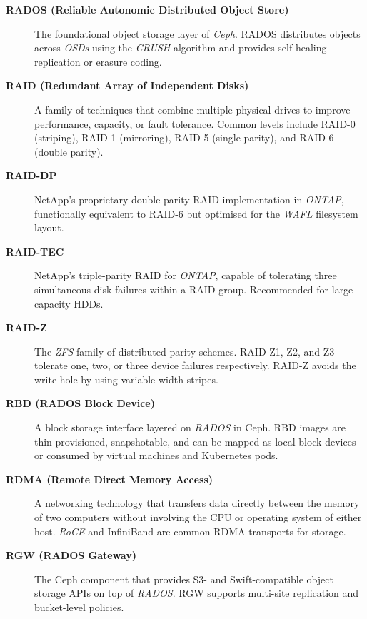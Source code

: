 \begin{description}

\item[\textbf{RADOS (Reliable Autonomic Distributed Object Store)}]
The foundational object storage layer of \textit{Ceph}. RADOS distributes
objects across \textit{OSDs} using the \textit{CRUSH} algorithm and
provides self-healing replication or erasure coding.

\item[\textbf{RAID (Redundant Array of Independent Disks)}]
A family of techniques that combine multiple physical drives to improve
performance, capacity, or fault tolerance. Common levels include RAID-0
(striping), RAID-1 (mirroring), RAID-5 (single parity), and RAID-6
(double parity).

\item[\textbf{RAID-DP}]
NetApp's proprietary double-parity RAID implementation in \textit{ONTAP},
functionally equivalent to RAID-6 but optimised for the \textit{WAFL}
filesystem layout.

\item[\textbf{RAID-TEC}]
NetApp's triple-parity RAID for \textit{ONTAP}, capable of tolerating three
simultaneous disk failures within a RAID group. Recommended for
large-capacity HDDs.

\item[\textbf{RAID-Z}]
The \textit{ZFS} family of distributed-parity schemes. RAID-Z1, Z2, and Z3
tolerate one, two, or three device failures respectively. RAID-Z avoids
the write hole by using variable-width stripes.

\item[\textbf{RBD (RADOS Block Device)}]
A block storage interface layered on \textit{RADOS} in Ceph. RBD images
are thin-provisioned, snapshotable, and can be mapped as local block
devices or consumed by virtual machines and Kubernetes pods.

\item[\textbf{RDMA (Remote Direct Memory Access)}]
A networking technology that transfers data directly between the memory of
two computers without involving the CPU or operating system of either host.
\textit{RoCE} and InfiniBand are common RDMA transports for storage.

\item[\textbf{RGW (RADOS Gateway)}]
The Ceph component that provides S3- and Swift-compatible object storage
APIs on top of \textit{RADOS}. RGW supports multi-site replication and
bucket-level policies.


\end{description}
